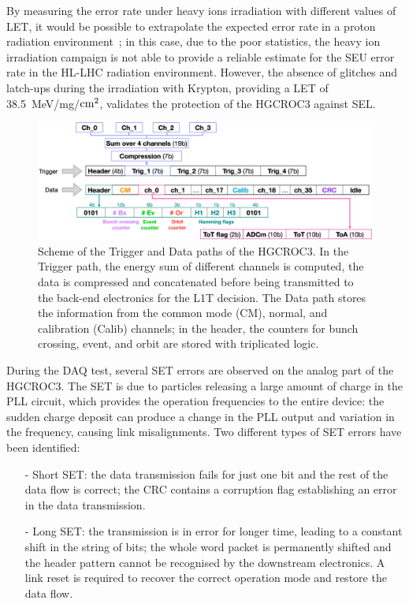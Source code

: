 By measuring the error rate under heavy ions irradiation with different values of LET, it would be possible to extrapolate the expected error rate in a proton radiation environment~\cite{federico}; in this case, due to the poor statistics, the heavy ion irradiation campaign is not able to provide a reliable estimate for the SEU error rate in the HL-LHC radiation environment.
However, the absence of glitches and latch-ups during the irradiation with Krypton, providing a LET of 38.5~MeV/mg/$\textnormal{cm}^2$, validates the protection of the HGCROC3 against SEL.

\begin{figure}
    \centering
    \includegraphics[width=0.95\linewidth]{Figures/HGCAL/TriggerDataPath.pdf}
    \caption{Scheme of the Trigger and Data paths of the HGCROC3. In the Trigger path, the energy sum of different channels is computed, the data is compressed and concatenated before being transmitted to the back-end electronics for the L1T decision. The Data path stores the information from the common mode (CM), normal, and calibration (Calib) channels; in the header, the counters for bunch crossing, event, and orbit are stored with triplicated logic.}
    \label{fig:TriggerDataPath}
\end{figure}

\bigbreak

During the DAQ test, several SET errors are observed on the analog part of the HGCROC3. The SET is due to particles releasing a large amount of charge in the PLL circuit, which provides the operation frequencies to the entire device: the sudden charge deposit can produce a change in the PLL output and variation in the frequency, causing link misalignments.
Two different types of SET errors have been identified:
\begin{itemize}
    \item [-] Short SET: the data transmission fails for just one bit and the rest of the data flow is correct; the CRC contains a corruption flag establishing an error in the data transmission.
    \item [-] Long SET: the transmission is in error for longer time, leading to a constant shift in the string of bits; the whole word packet is permanently shifted and the header pattern cannot be recognised by the downstream electronics. A link reset is required to recover the correct operation mode and restore the data flow.
\end{itemize}

